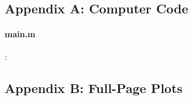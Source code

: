 \documentclass[12pt, letterpaper]{article}  %
\theoremstyle{definition}
\theoremstyle{remark}
\theoremstyle{plain}
\begin{document}




\newpage
\appendix
\appendixpage
\addappheadtotoc \setcounter{page}{1} 
\subsection*{Appendix A: Computer Code}
\singlespacing
\paragraph{main.m}:

\subsection*{Appendix B: Full-Page Plots}
\end{document}
